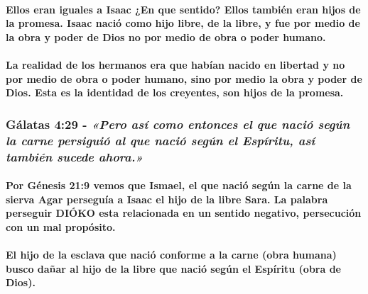 \documentclass[11a pt,twoside]{article}
\newcommand{\scripture}[1]{%
  {\fontsize{12pt}{16pt}\selectfont\ScriptureFont\itshape #1}%
}
\let\oldsubsubsection\subsubsection
\renewcommand{\subsubsection}{\needspace{4\baselineskip}\oldsubsubsection}
\let\oldparagraph\paragraph
\renewcommand{\paragraph}{\needspace{3\baselineskip}\oldparagraph}
\begin{document}
\paragraph{Ellos eran iguales a Isaac ¿En que sentido? Ellos también
eran hijos de la promesa. Isaac nació como hijo libre, de la libre, y
fue por medio de la obra y poder de Dios no por medio de obra o poder
humano.}\label{ellos-eran-iguales-a-isaac-en-que-sentido-ellos-tambiuxe9n-eran-hijos-de-la-promesa.-isaac-naciuxf3-como-hijo-libre-de-la-libre-y-fue-por-medio-de-la-obra-y-poder-de-dios-no-por-medio-de-obra-o-poder-humano.}

\paragraph{La realidad de los hermanos era que habían nacido en libertad
y no por medio de obra o poder humano, sino por medio la obra y poder de
Dios. Esta es la identidad de los creyentes, son hijos de la
promesa.}\label{la-realidad-de-los-hermanos-era-que-habuxedan-nacido-en-libertad-y-no-por-medio-de-obra-o-poder-humano-sino-por-medio-la-obra-y-poder-de-dios.-esta-es-la-identidad-de-los-creyentes-son-hijos-de-la-promesa.}

\subsubsection{\texorpdfstring{Gálatas 4:29 -
\scripture{«Pero así como entonces el que nació según la carne persiguió al que nació según el Espíritu, así también sucede ahora.»}}{Gálatas 4:29 - }}\label{guxe1latas-429---pero-asuxed-como-entonces-el-que-naciuxf3-seguxfan-la-carne-persiguiuxf3-al-que-naciuxf3-seguxfan-el-espuxedritu-asuxed-tambiuxe9n-sucede-ahora.}

\paragraph{Por Génesis 21:9 vemos que Ismael, el que nació según la
carne de la sierva Agar perseguía a Isaac el hijo de la libre Sara. La
palabra perseguir DIÓKO esta relacionada en un sentido negativo,
persecución con un mal
propósito.}\label{por-guxe9nesis-219-vemos-que-ismael-el-que-naciuxf3-seguxfan-la-carne-de-la-sierva-agar-perseguuxeda-a-isaac-el-hijo-de-la-libre-sara.-la-palabra-perseguir-diuxf3ko-esta-relacionada-en-un-sentido-negativo-persecuciuxf3n-con-un-mal-propuxf3sito.}

\paragraph{El hijo de la esclava que nació conforme a la carne (obra
humana) busco dañar al hijo de la libre que nació según el Espíritu
(obra de
Dios).}\label{el-hijo-de-la-esclava-que-naciuxf3-conforme-a-la-carne-obra-humana-busco-dauxf1ar-al-hijo-de-la-libre-que-naciuxf3-seguxfan-el-espuxedritu-obra-de-dios.}
\end{document}
